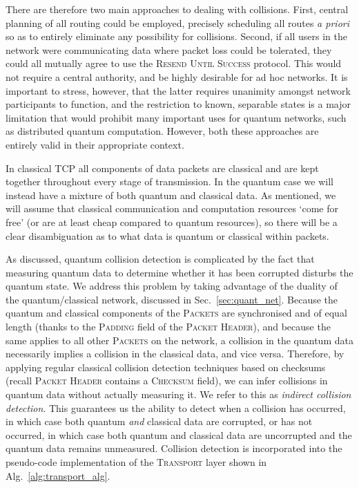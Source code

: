 There are therefore two main approaches to dealing with collisions. First, central planning of all routing could be employed, precisely scheduling all routes \textit{a priori} so as to entirely eliminate any possibility for collisions. Second, if all users in the network were communicating data where packet loss could be tolerated, they could all mutually agree to use the \textsc{Resend Until Success} protocol. This would not require a central authority, and be highly desirable for ad hoc networks. It is important to stress, however, that the latter requires unanimity amongst network participants to function, and the restriction to known, separable states is a major limitation that would prohibit many important uses for quantum networks, such as distributed quantum computation. However, both these approaches are entirely valid in their appropriate context.

In classical TCP all components of data packets are classical and are kept together throughout every stage of transmission. In the quantum case we will instead have a mixture of both quantum and classical data. As mentioned, we will assume that classical communication and computation resources `come for free' (or are at least cheap compared to quantum resources), so there will be a clear disambiguation as to what data is quantum or classical within packets.

As discussed, quantum collision detection is complicated by the fact that measuring quantum data to determine whether it has been corrupted disturbs the quantum state. We address this problem by taking advantage of the duality of the quantum/classical network, discussed in Sec.~\ref{sec:quant_net}. Because the quantum and classical components of the \textsc{Packets} are synchronised and of equal length (thanks to the \textsc{Padding} field of the \textsc{Packet Header}), and because the same applies to all other \textsc{Packets} on the network, a collision in the quantum data necessarily implies a collision in the classical data, and vice versa. Therefore, by applying regular classical collision detection techniques based on checksums (recall \textsc{Packet Header} contains a \textsc{Checksum} field), we can infer collisions in quantum data without actually measuring it. We refer to this as \textit{indirect collision detection}. This guarantees us the ability to detect when a collision has occurred, in which case both quantum \textit{and} classical data are corrupted, or has not occurred, in which case both quantum and classical data are uncorrupted and the quantum data remains unmeasured. Collision detection is incorporated into the pseudo-code implementation of the \textsc{Transport} layer shown in Alg.~\ref{alg:transport_alg}.


